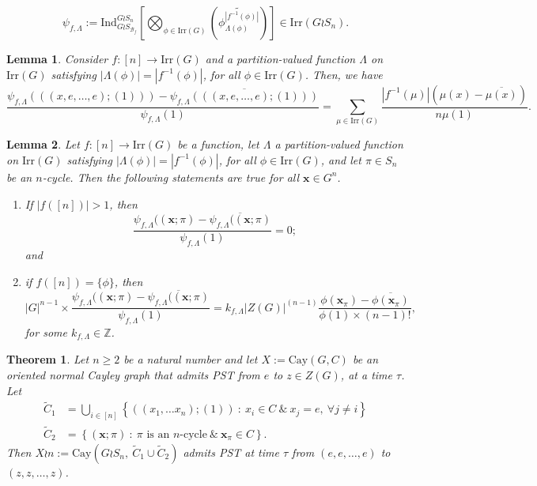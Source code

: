 \documentclass[10pt,a4paper]{amsart}
\newtheorem{theorem}{Theorem}
\newtheorem{lemma}{Lemma}
\newcommand{\bb}{\mathbb}
\newcommand{\irr}{\mathrm{Irr}}
\newcommand{\mbf}{\mathbf}
\newcommand{\mcal}{\mathcal}
\newcommand{\mrm}{\mathrm}
\newcommand{\ov}{\overline}
\begin{document}
\begin{equation}\label{eq:charwreathproduct}
\psi_{f,\Lambda}:= \mrm{Ind}_{G \wr S_{\mcal{B}_{f}}}^{G \wr S_{n}} \left[ \bigotimes_{\phi \in \irr(G)} \left(\widetilde{\phi^{|f^{-1}(\phi)|}_{\Lambda(\phi)}} \right)\right] \in \irr(G\wr S_{n}).
\end{equation}

\begin{lemma}\label{lem:centralcharacterc1}
Consider $f:[n]\to \irr(G)$ and a partition-valued function $\Lambda$ on $\irr(G)$ satisfying $|\Lambda(\phi)|=|f^{-1}(\phi)|$, for all $\phi \in \irr(G)$. Then, we have
\begin{equation*}
\dfrac{\psi_{f,\Lambda}(((x,e,\ldots, e); (1)))-\ov{\psi_{f,\Lambda}(((x,e,\ldots, e); (1)))}}{\psi_{f,\Lambda}(1)} = \sum\limits_{\mu \in \irr(G)}  \dfrac{|f^{-1}(\mu)| (\mu(x)-\ov{\mu(x)})}{n\mu(1)}.
\end{equation*}
\end{lemma}

\begin{lemma}\label{lem:centralcharacterc2}
Let $f:[n]\to \irr(G)$ be a function, let  $\Lambda$ a partition-valued function on $\irr(G)$ satisfying $|\Lambda(\phi)|=|f^{-1}(\phi)|$, for all $\phi \in \irr(G)$, and let $\pi \in S_{n}$ be an $n$-cycle.
Then the following statements are true for all $\mbf{x}\in G^{n}$.
\begin{enumerate}
    \item If $|f([n])|>1$, then 
    \[\dfrac{\psi_{f,\Lambda}((\mbf{x}; \pi)-\ov{\psi_{f,\Lambda}((\mbf{x}; \pi)}}{\psi_{f,\Lambda}(1)}=0;\] and
    \item if $f([n])=\{\phi\}$, then 
    \[
    |G|^{n-1} \times\dfrac{\psi_{f,\Lambda}((\mbf{x}; \pi)-\ov{\psi_{f,\Lambda}((\mbf{x}; \pi)}}{\psi_{f,\Lambda}(1)} = k_{f,\Lambda}|Z(G)|^{(n-1)} \dfrac{\phi\left( \mbf{x}_{\pi}  \right)-\ov{\phi\left( \mbf{x}_{\pi}  \right)}}{\phi(1) \times (n-1)!},
    \]
    for some $k_{f,\Lambda} \in \bb{Z}$. 
\end{enumerate}
\end{lemma}

\begin{theorem}\label{thm:wreath}
Let $n\geq 2$ be a natural number and let $X:=\mrm{Cay}(G,C)$ be an oriented normal Cayley graph that admits PST from $e$ to $z\in Z(G)$, at a time $\tau$. 
Let 
\begin{subequations}\label{eq:wreathconnex}
\begin{align}
\tilde{C}_{1} &=  \bigcup\limits_{i \in [n]} \left\{((x_{1}, \ldots x_{n}); (1))\ :\ x_{i}\in C\ \& \ x_{j}=e,\ \forall j\neq i\right\}\\
\tilde{C}_{2} &= \left\{(\mbf{x};\pi)\ :\ \text{$\pi$ is an $n$-cycle}\ \&\ \mbf{x}_{\pi}\in C\right\}.
\end{align} 
\end{subequations}
Then $X \wr n := \mrm{Cay}(G\wr S_{n},\ \tilde{C}_{1}\cup \tilde{C}_{2})$ admits PST at time $\tau$ from $(e,e,\ldots, e)$ to $(z,z,\ldots, z)$.
\end{theorem}
\end{document}
